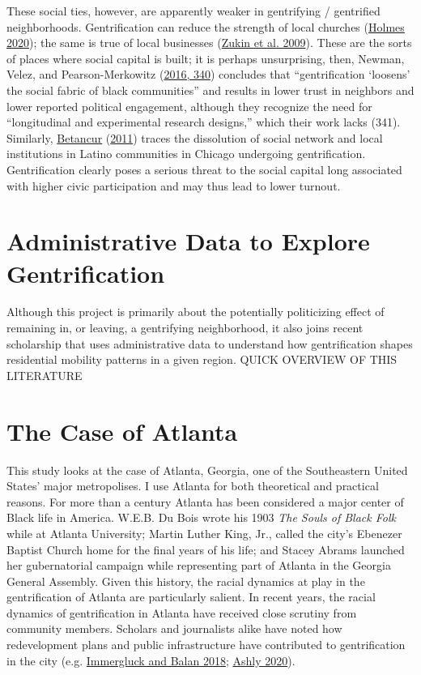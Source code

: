 \documentclass[
  12pt,
]{article}
\begin{document}
These social ties, however, are apparently weaker in gentrifying / gentrified neighborhoods. Gentrification can reduce the strength of local churches (\protect\hyperlink{ref-Holmes2020}{Holmes 2020}); the same is true of local businesses (\protect\hyperlink{ref-Zukin2009}{Zukin et al. 2009}). These are the sorts of places where social capital is built; it is perhaps unsurprising, then, Newman, Velez, and Pearson-Merkowitz (\protect\hyperlink{ref-Newman2016}{2016, 340}) concludes that ``gentrification `loosens' the social fabric of black communities'' and results in lower trust in neighbors and lower reported political engagement, although they recognize the need for ``longitudinal and experimental research designs,'' which their work lacks (341). Similarly, \protect\hyperlink{ref-Betancur2011}{Betancur} (\protect\hyperlink{ref-Betancur2011}{2011}) traces the dissolution of social network and local institutions in Latino communities in Chicago undergoing gentrification. Gentrification clearly poses a serious threat to the social capital long associated with higher civic participation and may thus lead to lower turnout.

\hypertarget{administrative-data-to-explore-gentrification}{%
\section{Administrative Data to Explore Gentrification}\label{administrative-data-to-explore-gentrification}}

Although this project is primarily about the potentially politicizing effect of remaining in, or leaving, a gentrifying neighborhood, it also joins recent scholarship that uses administrative data to understand how gentrification shapes residential mobility patterns in a given region. QUICK OVERVIEW OF THIS LITERATURE

\hypertarget{the-case-of-atlanta}{%
\section{The Case of Atlanta}\label{the-case-of-atlanta}}

This study looks at the case of Atlanta, Georgia, one of the Southeastern United States' major metropolises. I use Atlanta for both theoretical and practical reasons. For more than a century Atlanta has been considered a major center of Black life in America. W.E.B. Du Bois wrote his 1903 \emph{The Souls of Black Folk} while at Atlanta University; Martin Luther King, Jr., called the city's Ebenezer Baptist Church home for the final years of his life; and Stacey Abrams launched her gubernatorial campaign while representing part of Atlanta in the Georgia General Assembly. Given this history, the racial dynamics at play in the gentrification of Atlanta are particularly salient. In recent years, the racial dynamics of gentrification in Atlanta have received close scrutiny from community members. Scholars and journalists alike have noted how redevelopment plans and public infrastructure have contributed to gentrification in the city (e.g. \protect\hyperlink{ref-Immergluck2018}{Immergluck and Balan 2018}; \protect\hyperlink{ref-Ashly2020}{Ashly 2020}).
\end{document}
